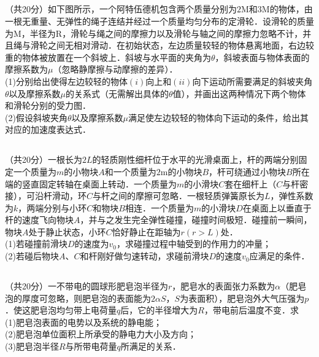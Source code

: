 \subsection{ }
（共20分）如下图所示，一个阿特伍德机包含两个质量分别为$2\mathrm{M}$和$3\mathrm{M}$的物体，由一根无重量、无弹性的绳子连结并经过一个质量均匀分布的定滑轮．设滑轮的质量为$\mathrm{M}$，半径为$\mathrm{R}$，滑轮与绳之间的摩擦力以及滑轮与轴之间的摩擦力忽略不计，并且绳与滑轮之间无相对滑动．在初始状态，左边质量较轻的物体悬离地面，右边较重的物体被放置在一个斜坡上．斜坡与水平面的夹角为$\theta$，斜坡表面与物体表面的摩擦系数为$\mu$（忽略静摩擦与动摩擦的差异）．\\
(1)分别给出使得左边较轻的物体$(i)$向上和$(ii)$向下运动所需要满足的斜坡夹角$\theta$以及摩擦系数$\mu$的关系式（无需解出具体的$\theta$值），并画出这两种情况下两个物体和滑轮分别的受力图．\\
(2)假设斜坡夹角$\theta$以及摩擦系数$\mu$满足使左边较轻的物体向下运动的条件，给出其对应的加速度表达式．\\
\subsection{ }
（共20分）一根长为$2L$的轻质刚性细杆位于水平的光滑桌面上，杆的两端分别固定一个质量为$m$的小物块$A$和一个质量为$2\mathrm{m}$的小物块$B$，杆可绕通过小物块$B$所在端的竖直固定转轴在桌面上转动．一个质量为$m$的小滑块$C$套在细杆上（$C$与杆密接），可沿杆滑动，环$C$与杆之间的摩擦可忽略．一根轻质弹簧原长为$L$，弹性系数为$k$，两端分别与小环$C$和物块$B$相连．一个质量为$m$的小滑块$D$在桌面上以垂直于杆的速度飞向物块$A$，并与之发生完全弹性碰撞，碰撞时间极短．碰撞前一瞬间，物块$A$处于静止状态，小环$C$恰好静止在距轴为$r(r>L)$处．\\
(1)若碰撞前滑块$D$的速度为$v_{0}$，求碰撞过程中轴受到的作用力的冲量；\\
(2)若碰后物块$A$、$C$和杆刚好做匀速转动，求碰前滑块$D$的速度$v_{0}$应满足的条件．\\
\subsection{ }
（共20分）一不带电的圆球形肥皂泡半径为$r$，肥皂水的表面张力系数为$\alpha$（肥皂泡的厚度可忽略，则肥皂泡的表面能为$2 \alpha S$，$S$为表面积），肥皂泡外大气压强为$p$．使这肥皂泡均匀带上电荷量$q$后，它的半径增大为$R$，带电前后温度不变．求\\
(1)肥皂泡表面的电势以及系统的静电能；\\
(2)肥皂泡单位面积上所承受的静电力大小及方向；\\
(3)肥皂泡半径$R$与所带电荷量$q$所满足的关系．\\
